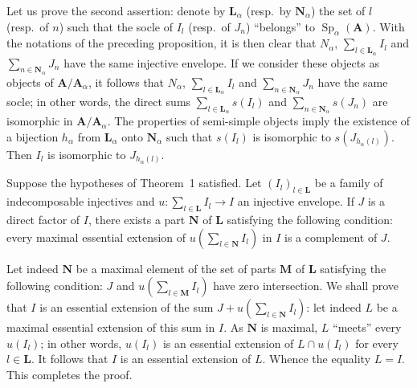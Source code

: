 Let us prove the second assertion: denote by $\mathbf{L}_\alpha$
(resp.\ by $\mathbf{N}_\alpha$) the set of $l$ (resp.\ of $n$) such
that the socle of $I_l$ (resp.\ of $J_n$) ``belongs'' to
$\operatorname{Sp}_\alpha(\mathbf{A})$. With the notations of the
preceding proposition, it is then clear that $N_\alpha$,
$\sum_{l\in\mathbf{L}_\alpha} I_l$ and
$\sum_{n\in\mathbf{N}_\alpha} J_n$ have the same injective envelope.
If we consider these objects as objects of
$\mathbf{A}/\mathbf{A}_\alpha$, it follows that $N_\alpha$,
$\sum_{l\in\mathbf{L}_\alpha} I_l$ and
$\sum_{n\in\mathbf{N}_\alpha} J_n$ have the same socle; in other words,
the direct sums $\sum_{l\in\mathbf{L}_\alpha} s(I_l)$ and
$\sum_{n\in\mathbf{N}_\alpha} s(J_n)$ are isomorphic in
$\mathbf{A}/\mathbf{A}_\alpha$. The properties of semi-simple objects
imply the existence of a bijection $h_\alpha$ from
$\mathbf{L}_\alpha$ onto $\mathbf{N}_\alpha$ such that $s(I_l)$ is
isomorphic to $s(J_{h_\alpha(l)})$. Then $I_l$ is isomorphic to
$J_{h_\alpha(l)}$.

\begin{proposition}
Suppose the hypotheses of Theorem~1 satisfied. Let
$(I_l)_{l\in\mathbf{L}}$ be a family of indecomposable injectives and
$u\colon \sum_{l\in\mathbf{L}} I_l \to I$ an injective envelope. If $J$
is a direct factor of $I$, there exists a part $\mathbf{N}$ of
$\mathbf{L}$ satisfying the following condition: every maximal
essential extension of $u\left(\sum_{l\in\mathbf{N}} I_l\right)$ in $I$
is a complement of $J$.
\end{proposition}

Let indeed $\mathbf{N}$ be a maximal element of the set of parts
$\mathbf{M}$ of $\mathbf{L}$ satisfying the following condition: $J$
and $u\left(\sum_{l\in\mathbf{M}} I_l\right)$ have zero intersection.
We shall prove that $I$ is an essential extension of the sum
$J + u\left(\sum_{l\in\mathbf{N}} I_l\right)$: let indeed $L$ be a
maximal essential extension of this sum in $I$. As $\mathbf{N}$ is
maximal, $L$ ``meets'' every $u(I_l)$; in other words, $u(I_l)$ is an
essential extension of $L \cap u(I_l)$ for every
$l \in \mathbf{L}$. It follows that $I$ is an essential extension of
$L$. Whence the equality $L = I$. This completes the proof.
